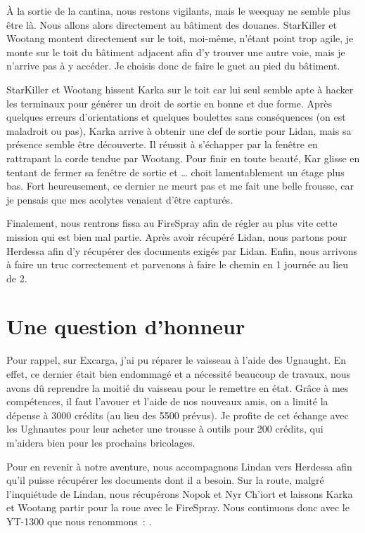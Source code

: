 \documentclass[a4paper,9pt,twoside,twocolumn,openany]{book}
\begin{document}
À la sortie de la cantina, nous restons vigilants, mais le weequay ne semble plus être là. Nous allons alors directement au bâtiment des douanes. StarKiller et Wootang montent directement sur le toit, moi-même, n’étant point trop agile, je monte sur le toit du bâtiment adjacent afin d'y trouver une autre voie, mais je n'arrive pas à y accéder. Je choisis donc de faire le guet au pied du bâtiment.

StarKiller et Wootang hissent Karka sur le toit car lui seul semble apte à hacker les terminaux pour générer un droit de sortie en bonne et due forme. Après quelques erreurs d'orientations et quelques boulettes sans conséquences (on est maladroit ou pas), Karka arrive à obtenir une clef de sortie pour Lidan, mais sa présence semble être découverte. Il réussit à s’échapper par la fenêtre en rattrapant la corde tendue par Wootang. Pour finir en toute beauté, Kar glisse en tentant de fermer sa fenêtre de sortie et … choit lamentablement un étage plus bas. Fort heureusement, ce dernier ne meurt pas et me fait une belle frousse, car je pensais que mes acolytes venaient d’être capturés.

Finalement, nous rentrons fissa au FireSpray afin de régler au plus vite cette mission qui est bien mal partie. Après avoir récupéré Lidan, nous partons pour Herdessa afin d’y récupérer des documents exigés par Lidan. Enfin, nous arrivons à faire un truc correctement et parvenons à faire le chemin en 1 journée au lieu de 2.

\section{Une question d’honneur}
\subtitle{28 mai 2016}

Pour rappel, sur Excarga, j’ai pu réparer le vaisseau à l'aide des Ugnaught. En effet, ce dernier était bien endommagé et a nécessité beaucoup de travaux, nous avons dû reprendre la moitié du vaisseau pour le remettre en état. Grâce à mes compétences, il faut l'avouer et l'aide de nos nouveaux amis, on a limité la dépense à 3000 crédits (au lieu des 5500 prévus). Je profite de cet échange avec les Ughnautes pour leur acheter une trousse à outils pour 200 crédits, qui m'aidera bien pour les prochains bricolages.

Pour en revenir à notre aventure, nous accompagnons Lindan vers Herdessa afin qu’il puisse récupérer les documents dont il a besoin. Sur la route, malgré l'inquiétude de Lindan, nous récupérons Nopok et Nyr Ch'iort et laissons Karka et Wootang partir pour la roue avec le FireSpray. Nous continuons donc avec le YT-1300 que nous renommons\ : \emph{}.
\end{document}
